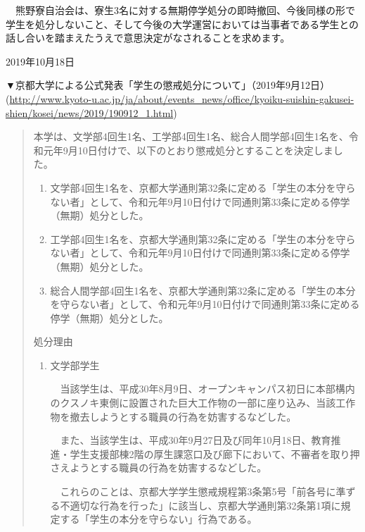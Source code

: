 {\begin{tcolorbox}[colback=white, colbacktitle=gray!30!white, coltitle=black, title=熊野寮生３名に対する無期停学処分の撤回を求める声明,breakable]
    　熊野寮自治会は、寮生3名に対する無期停学処分の即時撤回、今後同様の形で学生を処分しないこと、そして今後の大学運営においては当事者である学生との話し合いを踏まえたうえで意思決定がなされることを求めます。
    
    \begin{flushright}
    2019年10月18日
    \end{flushright}
    
    \vspace{5mm}
    \noindent ▼京都大学による公式発表「学生の懲戒処分について」（2019年9月12日）\\
    (\url{http://www.kyoto-u.ac.jp/ja/about/events_news/office/kyoiku-suishin-gakusei-shien/kosei/news/2019/190912_1.html})
    
    \begin{quotation}
    本学は、文学部4回生1名、工学部4回生1名、総合人間学部4回生1名を、令和元年9月10日付けで、以下のとおり懲戒処分とすることを決定しました。
    \begin{enumerate}
        \item 文学部4回生1名を、京都大学通則第32条に定める「学生の本分を守らない者」として、令和元年9月10日付けで同通則第33条に定める停学（無期）処分とした。
        \item 工学部4回生1名を、京都大学通則第32条に定める「学生の本分を守らない者」として、令和元年9月10日付けで同通則第33条に定める停学（無期）処分とした。
        \item 総合人間学部4回生1名を、京都大学通則第32条に定める「学生の本分を守らない者」として、令和元年9月10日付けで同通則第33条に定める停学（無期）処分とした。
    \end{enumerate}
    
    \vspace{4mm}
    \noindent 処分理由
    \begin{enumerate}
        \item 文学部学生
        
        　当該学生は、平成30年8月9日、オープンキャンパス初日に本部構内のクスノキ東側に設置された巨大工作物の一部に座り込み、当該工作物を撤去しようとする職員の行為を妨害するなどした。
    
        　また、当該学生は、平成30年9月27日及び同年10月18日、教育推進・学生支援部棟2階の厚生課窓口及び廊下において、不審者を取り押さえようとする職員の行為を妨害するなどした。
    
        　これらのことは、京都大学学生懲戒規程第3条第5号「前各号に準ずる不適切な行為を行った」に該当し、京都大学通則第32条第1項に規定する「学生の本分を守らない」行為である。
    

\end{enumerate}
\end{quotation}
\end{tcolorbox}}
